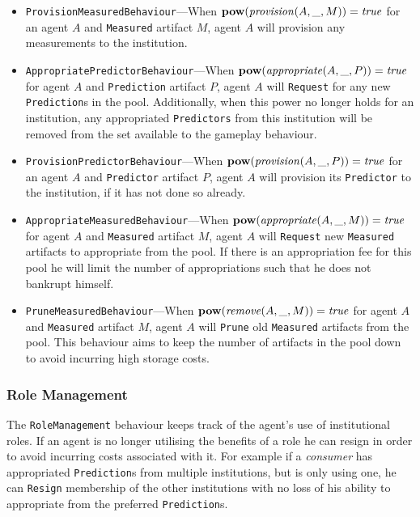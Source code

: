 \begin{itemize}
\item \texttt{ProvisionMeasuredBehaviour}---When $\mathbf{pow}(\mathit{provision}(A,\_,M)) = \mathit{true}$ for an agent $A$ and \texttt{Measured} artifact $M$, agent $A$ will provision any measurements to the institution.
\item \texttt{AppropriatePredictorBehaviour}---When $\mathbf{pow}(\mathit{appropriate}(A,\_,P)) = \mathit{true}$ for agent $A$ and \texttt{Prediction} artifact $P$, agent $A$ will \texttt{Request} for any new \texttt{Prediction}s in the pool. Additionally, when this power no longer holds for an institution, any appropriated \texttt{Predictors} from this institution will be removed from the set available to the gameplay behaviour.
\item \texttt{ProvisionPredictorBehaviour}---When $\mathbf{pow}(\mathit{provision}(A,\_,P)) = \mathit{true}$ for an agent $A$ and \texttt{Predictor} artifact $P$, agent $A$ will provision its \texttt{Predictor} to the institution, if it has not done so already.
\item \texttt{AppropriateMeasuredBehaviour}---When $\mathbf{pow}(\mathit{appropriate}(A,\_,M)) = \mathit{true}$ for agent $A$ and \texttt{Measured} artifact $M$, agent $A$ will \texttt{Request} new \texttt{Measured} artifacts to appropriate from the pool. If there is an appropriation fee for this pool he will limit the number of appropriations such that he does not bankrupt himself.
\item \texttt{PruneMeasuredBehaviour}---When $\mathbf{pow}(\mathit{remove}(A,\_,M)) = \mathit{true}$ for agent $A$ and \texttt{Measured} artifact $M$, agent $A$ will \texttt{Prune} old \texttt{Measured} artifacts from the pool. This behaviour aims to keep the number of artifacts in the pool down to avoid incurring high storage costs.
\end{itemize}

\subsubsection*{Role Management}

The \texttt{RoleManagement} behaviour keeps track of the agent's use of
institutional roles. If an agent is no longer utilising the benefits of a role
he can resign in order to avoid incurring costs associated with it. For
example if a \emph{consumer} has appropriated \texttt{Prediction}s from
multiple institutions, but is only using one, he can \texttt{Resign}
membership of the other institutions with no loss of his ability to
appropriate from the preferred \texttt{Prediction}s.

